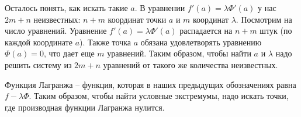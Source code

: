 Осталось понять, как искать такие $a$.
В уравнении $f'(a) = \lambda \Phi'(a)$ у нас $2m + n$ неизвестных: $n + m$ координат точки $a$ и $m$ координат $\lambda$.
Посмотрим на число уравнений. 
Уравнение $f'(a) = \lambda \Phi'(a)$ распадается на $n + m$ штук (по каждой координате $a$).
Также точка $a$ обязана удовлетворять уравнению $\Phi(a) = 0$, что дает еще $m$ уравнений.
Таким образом, чтобы найти $a$ и $\lambda$ надо решить систему из $2m + n$ уравнений от такого же количества неизвестных. 
 
\vspace*{5mm}

\begin{conj}
    Функция Лагранжа -- функция, которая в наших предыдущих обозначениях равна $f - \lambda \Phi$.
    Таким образом, чтобы найти условные экстремумы, надо искать точки, где производная функции Лагранжа нулится.
\end{conj}
